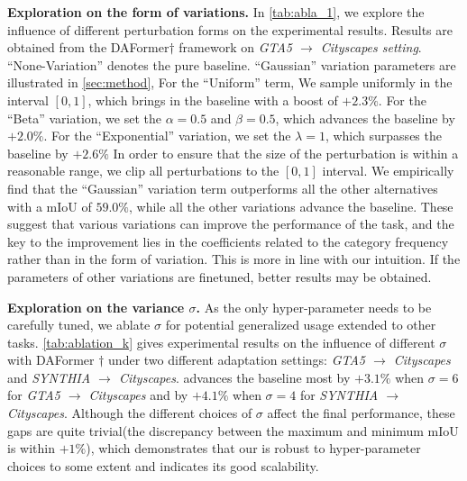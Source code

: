 \noindent \textbf{Exploration on the form of variations.} In \cref{tab:abla_1}, we explore the influence of different perturbation forms on the experimental results.
%
Results are obtained from the DAFormer$\dag$ framework on \textit{GTA5 $\to$ Cityscapes setting}.
%
``None-Variation'' denotes the pure baseline. 
%
``Gaussian'' variation parameters are illustrated in \cref{sec:method},
%
For the ``Uniform'' term, We sample uniformly in the interval $\left[0, 1\right]$, which brings in the baseline with a boost of $+2.3\%$.
%
For the ``Beta'' variation, we set the $\alpha=0.5$ and $\beta=0.5$, which advances the baseline by $+2.0\%$.
%
For the ``Exponential'' variation, we set the $\lambda=1$, which surpasses the baseline by $+2.6\%$ 
%
In order to ensure that the size of the perturbation is within a reasonable range, we clip all perturbations to the $\left[0, 1\right]$ interval.
%
We empirically find that the ``Gaussian'' variation term outperforms all the other alternatives with a mIoU of $59.0\%$, while all the other variations advance the baseline.
%
These suggest that various variations can improve the performance of the task, and the key to the improvement lies in the coefficients related to the category frequency rather than in the form of variation.
%
This is more in line with our intuition.
%
If the parameters of other variations are finetuned, better results may be obtained.
%


\noindent \textbf{Exploration on the variance $\sigma$.} As the only hyper-parameter needs to be carefully tuned, we ablate $\sigma$ for potential generalized usage extended to other tasks. 
%
\cref{tab:ablation_k} gives experimental results on the influence of different $\sigma$ with DAFormer $\dag$ under two different adaptation settings: \textit{GTA5 $\to$ Cityscapes} and \textit{SYNTHIA $\to$ Cityscapes}. 
%
\method advances the baseline most by $+3.1\%$ when $\sigma=6$ for \textit{GTA5 $\to$ Cityscapes} and  by $+4.1\%$ when $\sigma=4$ for \textit{SYNTHIA $\to$ Cityscapes}.
%
Although the different choices of $\sigma$ affect the final performance, these gaps are quite trivial(the discrepancy between the maximum and minimum mIoU is within $+1\%$), which demonstrates that our \method is robust to hyper-parameter choices to some extent and indicates its good scalability.


